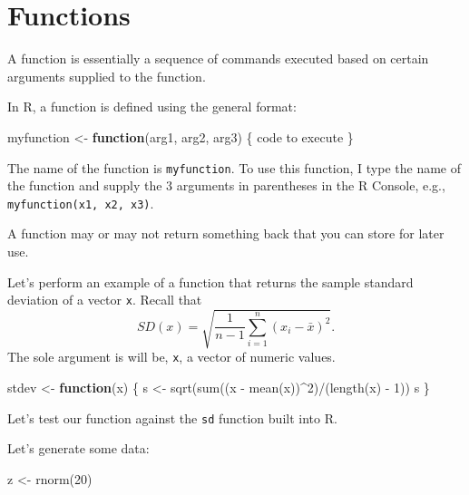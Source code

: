 \documentclass[
]{article}
\newenvironment{Shaded}{\begin{snugshade}}{\end{snugshade}}
\newcommand{\ControlFlowTok}[1]{\textcolor[rgb]{0.13,0.29,0.53}{\textbf{#1}}}
\newcommand{\DecValTok}[1]{\textcolor[rgb]{0.00,0.00,0.81}{#1}}
\newcommand{\FunctionTok}[1]{\textcolor[rgb]{0.00,0.00,0.00}{#1}}
\newcommand{\NormalTok}[1]{#1}
\newcommand{\OtherTok}[1]{\textcolor[rgb]{0.56,0.35,0.01}{#1}}
\newcommand{\SpecialCharTok}[1]{\textcolor[rgb]{0.00,0.00,0.00}{#1}}
\begin{document}
\hypertarget{functions-1}{%
\section{Functions}\label{functions-1}}

A function is essentially a sequence of commands executed based on
certain arguments supplied to the function.

In R, a function is defined using the general format:

\begin{Shaded}
\begin{Highlighting}[]
\NormalTok{myfunction }\OtherTok{\textless{}{-}} \ControlFlowTok{function}\NormalTok{(arg1, arg2, arg3) \{}
\NormalTok{    code to execute}
\NormalTok{\}}
\end{Highlighting}
\end{Shaded}

The name of the function is \texttt{myfunction}. To use this function, I
type the name of the function and supply the 3 arguments in parentheses
in the R Console, e.g., \texttt{myfunction(x1,\ x2,\ x3)}.

A function may or may not return something back that you can store for
later use.

Let's perform an example of a function that returns the sample standard
deviation of a vector \texttt{x}. Recall that
\[SD(x) = \sqrt{\frac{1}{n-1}\sum_{i=1}^n (x_i - \bar{x})^2}.\] The sole
argument is will be, \texttt{x}, a vector of numeric values.

\begin{Shaded}
\begin{Highlighting}[]
\NormalTok{stdev }\OtherTok{\textless{}{-}} \ControlFlowTok{function}\NormalTok{(x) \{}
\NormalTok{    s }\OtherTok{\textless{}{-}} \FunctionTok{sqrt}\NormalTok{(}\FunctionTok{sum}\NormalTok{((x }\SpecialCharTok{{-}} \FunctionTok{mean}\NormalTok{(x))}\SpecialCharTok{\^{}}\DecValTok{2}\NormalTok{)}\SpecialCharTok{/}\NormalTok{(}\FunctionTok{length}\NormalTok{(x) }\SpecialCharTok{{-}} \DecValTok{1}\NormalTok{))}
\NormalTok{    s}
\NormalTok{\}}
\end{Highlighting}
\end{Shaded}

Let's test our function against the \texttt{sd} function built into R.

Let's generate some data:

\begin{Shaded}
\begin{Highlighting}[]
\NormalTok{z }\OtherTok{\textless{}{-}} \FunctionTok{rnorm}\NormalTok{(}\DecValTok{20}\NormalTok{)}
\end{Highlighting}
\end{Shaded}
\end{document}
